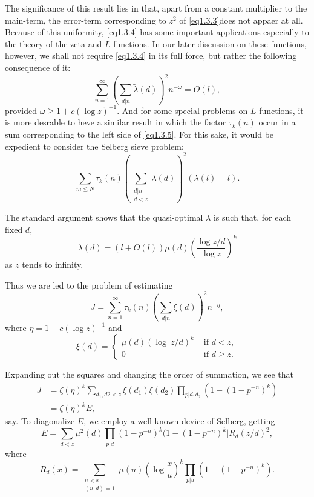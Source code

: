 The significance of this result lies in that, apart from a constant
multiplier to the main-term, the error-term corresponding to $z^2$ of
\eqref{eq1.3.3}\pageoriginale does not appaer at all. Because of
this uniformity, 
\eqref{eq1.3.4} has some important applications especially to
the theory of 
the zeta-and $L$-functions. In our later discussion on these functions,
however, we shall not require \eqref{eq1.3.4} in its full force,
but rather the following consequence of it: 
\begin{equation*}
  \sum_{n=1}^{\infty} \left(\sum_{d|n} \tilde{\lambda} (d)\right)^2 n^{-\omega}=
  O(l),\tag{1.3.5} \label{eq1.3.5}
\end{equation*} 
provided $\omega \geq 1 + c (\log z)^{-1}$. And for some special
problems on $L$-functions, it is more desrable to heve a similar result
in which the factor $\tau_{k} (n)$ occur in a sum corresponding to the
left side of \eqref{eq1.3.5}. For this sake, it would be expedient to
consider the Selberg sieve problem: 
$$
 \sum_{m \leq N} \tau_{k}(n) \left(\sum_{\substack{d|n \\ d<z}} \lambda
 (d)\right)^2 (\lambda (l) =l). 
$$ 

The standard argument shows that the quasi-optimal $\lambda$ is such
that, for each fixed $d$, 
$$
\lambda(d) = (l + O(l)) \mu (d) \left(\frac{\log z/d}{\log z}\right)^k
$$
as $z$ tends to infinity.

Thus we are led to the problem of estimating
\begin{equation*}
  J= \sum_{n=1}^{\infty} \tau_{k}(n) (\sum_{d|n} \xi (d))^2 n^{-\eta},
  \tag{1.3.6}\label{eq1.3.6} 
\end{equation*}
 where $\eta =1 + c (\log z)^{-1}$ and 
$$
\xi (d) = 
\begin{cases}
  \mu (d) ( \log ~  z/d)^k & \text{ if }  d < z,\\
  0   &  \text{ if }  d  \ge z.
\end{cases}
$$\pageoriginale

Expanding out the squares and changing the order of summation, we see that
\begin{equation*}
  \begin{aligned}
    J & = \zeta ( \eta )^k \sum_{d_1,d2 < z} \xi (d_1) \xi (d_2)
    \prod_{p | d_1 d_2} (1-(1-p^{-n})^k) \\
    & = \zeta (\eta)^k E, 
  \end{aligned}\tag{1.3.7}\label{eq1.3.7}
\end{equation*} 
 say. To diagonalize $E$, we employ a well-known device of Selberg, gett\-ing
 \begin{equation*}
   E= \sum_{d<z} \mu^2(d) \prod_{p | d} (1-p^{-n})^k (1-(1-p^{-n})^k
   |{ R_d (z/d )}^2, \tag{1.3.8} \label{eq1.3.8}
 \end{equation*} 
where
$$
R_d(x) =  \sum_{\substack{u<x\\(u,d)=1}} \mu (u) (\log
\frac{x}{u})^k  \prod_{p | u} (1-(1-p ^{-n}) ^k ). 
$$ 
 
